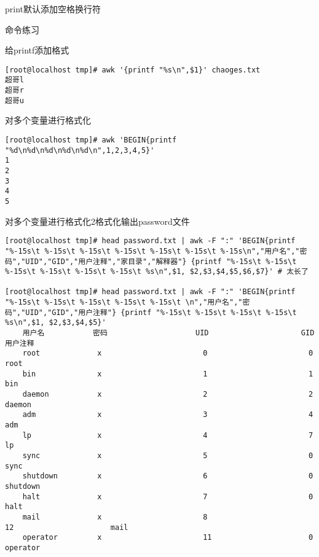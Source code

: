 print默认添加空格换行符
\begin{ascolorbox10}{命令练习}
	\begin{ascboxJ}{给printf添加格式}
		\begin{lstlisting}[style=linux]
[root@localhost tmp]# awk '{printf "%s\n",$1}' chaoges.txt
超哥l
超哥r
超哥u
		\end{lstlisting}
\end{ascboxJ}
\begin{ascboxJ}{对多个变量进行格式化}
\begin{lstlisting}[style=linux]
[root@localhost tmp]# awk 'BEGIN{printf "%d\n%d\n%d\n%d\n%d\n",1,2,3,4,5}'
1
2
3
4
5
	\end{lstlisting}
\end{ascboxJ}

\begin{ascboxJ}{对多个变量进行格式化2格式化输出password文件}
	\begin{lstlisting}[style=linux]
[root@localhost tmp]# head password.txt | awk -F ":" 'BEGIN{printf "%-15s\t %-15s\t %-15s\t %-15s\t %-15s\t %-15s\t %-15s\n","用户名","密码","UID","GID","用户注释","家目录","解释器"} {printf "%-15s\t %-15s\t %-15s\t %-15s\t %-15s\t %-15s\t %s\n",$1, $2,$3,$4,$5,$6,$7}' # 太长了

[root@localhost tmp]# head password.txt | awk -F ":" 'BEGIN{printf "%-15s\t %-15s\t %-15s\t %-15s\t %-15s\t \n","用户名","密码","UID","GID","用户注释"} {printf "%-15s\t %-15s\t %-15s\t %-15s\t %s\n",$1, $2,$3,$4,$5}'
	用户名           密码                    UID                     GID                     用户注释
	root             x                       0                       0                       root
	bin              x                       1                       1                       bin
	daemon           x                       2                       2                       daemon
	adm              x                       3                       4                       adm
	lp               x                       4                       7                       lp
	sync             x                       5                       0                       sync
	shutdown         x                       6                       0                       shutdown
	halt             x                       7                       0                       halt
	mail             x                       8                       12                      mail
	operator         x                       11                      0                       operator
		\end{lstlisting}
	\end{ascboxJ}	
\end{ascolorbox10}


